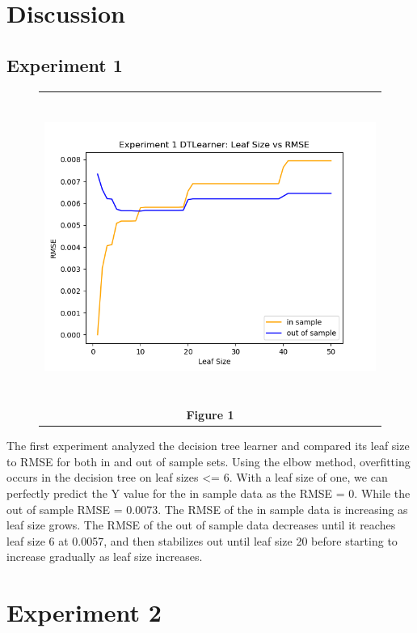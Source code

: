 \documentclass[
	letterpaper, %
]{jdf}
\begin{document}
\pagebreak

\section{Discussion}

\subsection{Experiment 1}

\begin{figure}[h]
	\begin{tabular}{c}
		\includegraphics[height=10cm]{experiment_1.png} \\
		\textbf{Figure 1} \\
	\end{tabular}
\end{figure}

The first experiment analyzed the decision tree learner and compared its leaf size to RMSE for both in and out of sample sets.  Using the elbow method, overfitting occurs in the decision tree on leaf sizes <= 6. With a leaf size of one, we can perfectly predict the Y value for the in sample data as the RMSE = 0. While the out of sample RMSE = 0.0073. The RMSE of the in sample data is increasing as leaf size grows.  The RMSE of the out of sample data decreases until it reaches leaf size 6 at 0.0057, and then stabilizes out until leaf size 20 before starting to increase gradually as leaf size increases.

\pagebreak

\section{Experiment 2}
\end{document}
